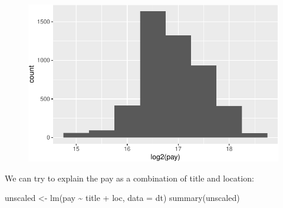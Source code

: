 \documentclass[
  letterpaper,
  DIV=11,
  numbers=noendperiod]{scrreprt}
\newenvironment{Shaded}{\begin{snugshade}}{\end{snugshade}}
\newcommand{\AttributeTok}[1]{\textcolor[rgb]{0.40,0.45,0.13}{#1}}
\newcommand{\FunctionTok}[1]{\textcolor[rgb]{0.28,0.35,0.67}{#1}}
\newcommand{\NormalTok}[1]{\textcolor[rgb]{0.00,0.23,0.31}{#1}}
\newcommand{\OtherTok}[1]{\textcolor[rgb]{0.00,0.23,0.31}{#1}}
\newcommand{\SpecialCharTok}[1]{\textcolor[rgb]{0.37,0.37,0.37}{#1}}
\begin{document}
\begin{figure}[H]

{\centering \includegraphics{./08-linearreg_files/figure-pdf/unnamed-chunk-33-1.pdf}

}

\end{figure}

We can try to explain the pay as a combination of title and location:

\begin{Shaded}
\begin{Highlighting}[]
\NormalTok{unscaled }\OtherTok{\textless{}{-}} \FunctionTok{lm}\NormalTok{(pay }\SpecialCharTok{\textasciitilde{}}\NormalTok{ title }\SpecialCharTok{+}\NormalTok{ loc, }\AttributeTok{data =}\NormalTok{ dt)}
\FunctionTok{summary}\NormalTok{(unscaled)}
\end{Highlighting}
\end{Shaded}
\end{document}
